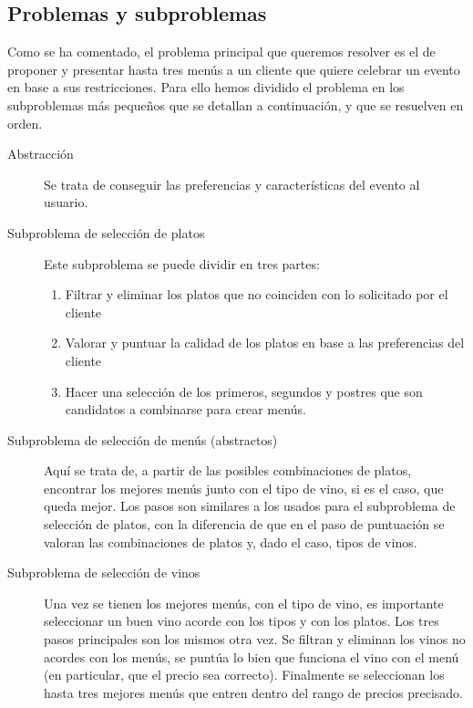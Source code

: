 \subsection{Problemas y subproblemas}
Como se ha comentado, el problema principal que queremos resolver es el de
proponer y presentar hasta tres menús a un cliente que quiere celebrar un
evento en base a sus restricciones. Para ello hemos dividido el problema en los
subproblemas más pequeños que se detallan a continuación, y que se resuelven en
orden.

\begin{description}
  \item[Abstracción] Se trata de conseguir las preferencias y características
    del evento al usuario.
  \item[Subproblema de selección de platos] Este subproblema se puede dividir
    en tres partes:
    \begin{enumerate}
      \item Filtrar y eliminar los platos que no coinciden con lo solicitado
        por el cliente        
      \item Valorar y puntuar la calidad de los platos en base a las
        preferencias del cliente
      \item Hacer una selección de los primeros, segundos y postres que son
        candidatos a combinarse para crear menús.
    \end{enumerate}
  \item[Subproblema de selección de menús (abstractos)] Aquí se trata de, a
    partir de las posibles combinaciones de platos, encontrar los mejores menús
    junto con el tipo de vino, si es el caso, que queda mejor. Los pasos son
    similares a los usados para el subproblema de selección de platos, con la
    diferencia de que en el paso de puntuación se valoran las combinaciones de
    platos y, dado el caso, tipos de vinos.
  \item[Subproblema de selección de vinos] Una vez se tienen los mejores menús,
    con el tipo de vino, es importante seleccionar un buen vino acorde con los
    tipos y con los platos. Los tres pasos principales son los mismos otra
    vez. Se filtran y eliminan los vinos no acordes con los menús, se puntúa lo
    bien que funciona el vino con el menú (en particular, que el precio sea
    correcto). Finalmente se seleccionan los hasta tres mejores menús que
    entren dentro del rango de precios precisado.
\end{description}
